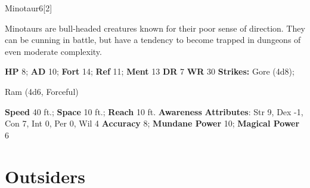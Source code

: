   \begin{monsection}{Minotaur}{6}[2]
    \vspace{-1em}\vspace{-1em}
    \vspace{0em}

    
      Minotaurs are bull-headed creatures known for their poor sense of direction.
      They can be cunning in battle, but have a tendency to become trapped in dungeons of even moderate complexity.
    

    \begin{spellcontent}
      \begin{spelltargetinginfo}
        \pari \textbf{HP} 8;
          \textbf{AD} 10;
          \textbf{Fort} 14;
          \textbf{Ref} 11;
          \textbf{Ment} 13
        \pari \textbf{DR} 7
        \pari \textbf{WR} 30
        \pari \textbf{Strikes:}
            Gore  (4d8);
\par Ram  (4d6, Forceful)
      \end{spelltargetinginfo}
    \end{spellcontent}
    \begin{monsterfooter}
      \pari \textbf{Speed} 40 ft.;
        \textbf{Space} 10 ft.;
        \textbf{Reach} 10 ft.
      \pari \textbf{Awareness} 
      \pari \textbf{Attributes}:
        Str 9, Dex -1,
        Con 7, Int 0,
        Per 0, Wil 4
      \pari \textbf{Accuracy} 8;
        \textbf{Mundane Power} 10;
      \textbf{Magical Power} 6
    \end{monsterfooter}
  \end{monsection}
  
  
        \section{Outsiders}
      

